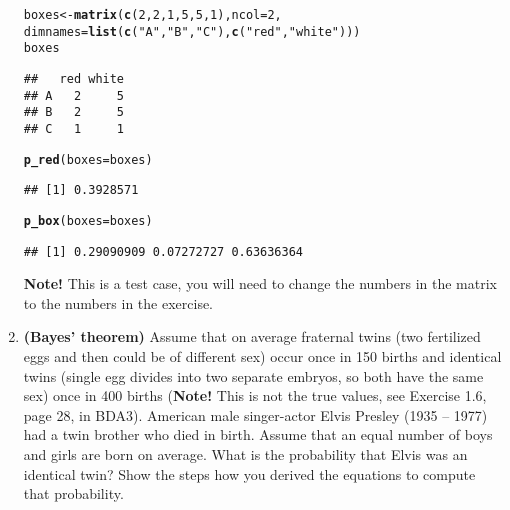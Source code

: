 \documentclass[11pt,a4paper,english]{article}\usepackage[]{graphicx}\usepackage[]{xcolor}
\makeatletter
\newcommand{\hlnum}[1]{\textcolor[rgb]{0.686,0.059,0.569}{#1}}%
\newcommand{\hlstr}[1]{\textcolor[rgb]{0.192,0.494,0.8}{#1}}%
\newcommand{\hlstd}[1]{\textcolor[rgb]{0.345,0.345,0.345}{#1}}%
\newcommand{\hlkwb}[1]{\textcolor[rgb]{0.69,0.353,0.396}{#1}}%
\newcommand{\hlkwc}[1]{\textcolor[rgb]{0.333,0.667,0.333}{#1}}%
\newcommand{\hlkwd}[1]{\textcolor[rgb]{0.737,0.353,0.396}{\textbf{#1}}}%
\newenvironment{kframe}{%
 \def\at@end@of@kframe{}%
 \ifinner\ifhmode%
  \def\at@end@of@kframe{\end{minipage}}%
  \begin{minipage}{\columnwidth}%
 \fi\fi%
 \def\FrameCommand##1{\hskip\@totalleftmargin \hskip-\fboxsep
 \colorbox{shadecolor}{##1}\hskip-\fboxsep
     \hskip-\linewidth \hskip-\@totalleftmargin \hskip\columnwidth}%
 \MakeFramed {\advance\hsize-\width
   \@totalleftmargin\z@ \linewidth\hsize
   \@setminipage}}%
 {\par\unskip\endMakeFramed%
 \at@end@of@kframe}
\newenvironment{knitrout}{}{} %
\makeatother
\begin{document}
\begin{enumerate}
\begin{knitrout}\small
{}\color{fgcolor}\begin{kframe}
\begin{alltt}
\hlstd{boxes} \hlkwb{<-} \hlkwd{matrix}\hlstd{(}\hlkwd{c}\hlstd{(}\hlnum{2}\hlstd{,}\hlnum{2}\hlstd{,}\hlnum{1}\hlstd{,}\hlnum{5}\hlstd{,}\hlnum{5}\hlstd{,}\hlnum{1}\hlstd{),} \hlkwc{ncol} \hlstd{=} \hlnum{2}\hlstd{,}
   \hlkwc{dimnames} \hlstd{=} \hlkwd{list}\hlstd{(}\hlkwd{c}\hlstd{(}\hlstr{"A"}\hlstd{,} \hlstr{"B"}\hlstd{,} \hlstr{"C"}\hlstd{),} \hlkwd{c}\hlstd{(}\hlstr{"red"}\hlstd{,} \hlstr{"white"}\hlstd{)))}
\hlstd{boxes}
\end{alltt}
\begin{verbatim}
##   red white
## A   2     5
## B   2     5
## C   1     1
\end{verbatim}
\end{kframe}
\end{knitrout}



\begin{knitrout}\small
{}\color{fgcolor}\begin{kframe}
\begin{alltt}
\hlkwd{p_red}\hlstd{(}\hlkwc{boxes} \hlstd{= boxes)}
\end{alltt}
\begin{verbatim}
## [1] 0.3928571
\end{verbatim}
\begin{alltt}
\hlkwd{p_box}\hlstd{(}\hlkwc{boxes} \hlstd{= boxes)}
\end{alltt}
\begin{verbatim}
## [1] 0.29090909 0.07272727 0.63636364
\end{verbatim}
\end{kframe}
\end{knitrout}

\textbf{Note!} This is a test case, you will need to change the numbers in the matrix to the numbers in the exercise.

\item {\bf (Bayes' theorem)} Assume that on average fraternal twins (two fertilized eggs and then could be of different sex) occur once in 150 births and identical twins (single egg divides into two separate
embryos, so both have the same sex) once in 400 births (\textbf{Note!} This is not the true values, see Exercise 1.6, page 28, in BDA3).
American male singer-actor Elvis Presley (1935 -- 1977) had a twin brother who died in birth.
Assume that an equal number of boys and girls are born on average.
What is the probability that Elvis was an identical twin? 
Show the steps how you derived the equations to compute that probability.


\end{enumerate}
\end{document}
